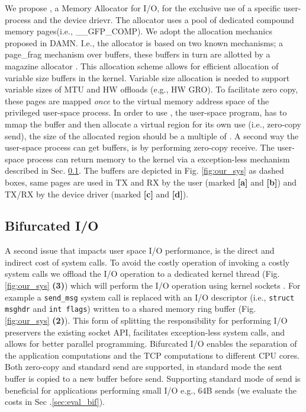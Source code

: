 We propose \oursys, a Memory Allocator for I/O, for the  exclusive use of a specific user-process and the device drievr. The \oursys allocator uses a pool of dedicated compound memory pages(i.e., \_\_GFP\_COMP). We adopt the allocation mechanics proposed in DAMN\cite{markuze2018damn}. I.e., the allocator is based on two known mechanisms; a page\_frag mechanism \cite{pagefrag} over \size buffers, these buffers in turn are allotted by a magazine allocator \cite{bonwick2001magazines}. This allocation scheme allows for efficient allocation of variable size buffers in the kernel. Variable size allocation is needed to support variable sizes of MTU and HW offloads (e.g., HW GRO). To facilitate zero copy, these pages are mapped \emph{once} to the virtual memory address space of the privileged user-space process. In order to use \oursys, the user-space program, has to mmap the \oursys buffer and then allocate a virtual region for its own use (i.e., zero-copy send), the size of the allocated region should be a multiple of \size. A second way the user-space process can get \oursys buffers, is by performing zero-copy receive. The user-space process can return memory to the kernel via a exception-less mechanism described in Sec. \ref{sec:bifurcated}.
The \oursys buffers are depicted in Fig. \ref{fig:our_sys} as dashed boxes, same pages are used in TX and RX by the user (marked \textbf{[a]} and \textbf{[b]}) and TX/RX by the device driver (marked \textbf{[c]} and \textbf{[d]}). 
\subsection{Bifurcated I/O}\label{sec:bifurcated}
A second issue that impacts user space I/O performance, is the direct and indirect cost of system calls\cite{flexsc}.
To avoid the costly operation of invoking a costly system calls we offload the I/O operation to a dedicated kernel thread (Fig. \ref{fig:our_sys} \textbf{(3)}) which will perform the I/O operation using kernel sockets \cite{ktcp}. For example a \texttt{send\_msg} system call is replaced with an I/O descriptor (i.e., \texttt{struct msghdr} and \texttt{int flags}) written to a shared memory ring buffer (Fig. \ref{fig:our_sys} \textbf{(2)}). This form of splitting the responsibility for performing I/O preservers the existing socket API, facilitates exception-less system calls, and allows for better parallel programming. Bifurcated I/O enables the separation of the application computations and the TCP computations to different CPU cores. Both zero-copy and standard send are supported, in standard mode the sent buffer is copied to a new \oursys buffer before send. Supporting standard mode of send is beneficial for applications performing small I/O e.g., 64B sends (we evaluate the costs in Sec .\ref{sec:eval_bif}).

